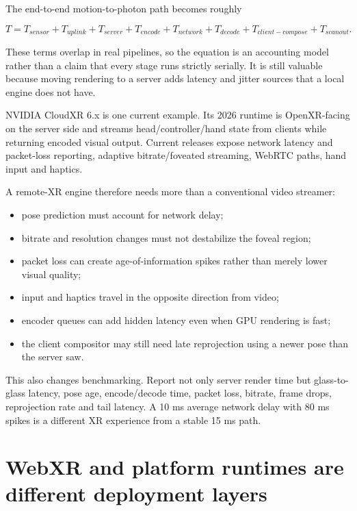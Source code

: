 The end-to-end motion-to-photon path becomes roughly

\[
T =
T_{sensor}
+T_{uplink}
+T_{server}
+T_{encode}
+T_{network}
+T_{decode}
+T_{client-compose}
+T_{scanout}.
\]

These terms overlap in real pipelines, so the equation is an accounting model rather than a claim that every stage runs strictly serially. It is still valuable because moving rendering to a server adds latency and jitter sources that a local engine does not have.

NVIDIA CloudXR 6.x is one current example. Its 2026 runtime is OpenXR-facing on the server side and streams head/controller/hand state from clients while returning encoded visual output. Current releases expose network latency and packet-loss reporting, adaptive bitrate/foveated streaming, WebRTC paths, hand input and haptics.

A remote-XR engine therefore needs more than a conventional video streamer:

\begin{itemize}
\tightlist
\item
  pose prediction must account for network delay;
\item
  bitrate and resolution changes must not destabilize the foveal region;
\item
  packet loss can create age-of-information spikes rather than merely lower visual quality;
\item
  input and haptics travel in the opposite direction from video;
\item
  encoder queues can add hidden latency even when GPU rendering is fast;
\item
  the client compositor may still need late reprojection using a newer pose than the server saw.
\end{itemize}

This also changes benchmarking. Report not only server render time but glass-to-glass latency, pose age, encode/decode time, packet loss, bitrate, frame drops, reprojection rate and tail latency. A 10 ms average network delay with 80 ms spikes is a different XR experience from a stable 15 ms path.

\section{WebXR and platform runtimes are different deployment layers}\label{06-engine-ii-ch042-webxr-and-platform-runtimes-are-different-deployment-layers}

